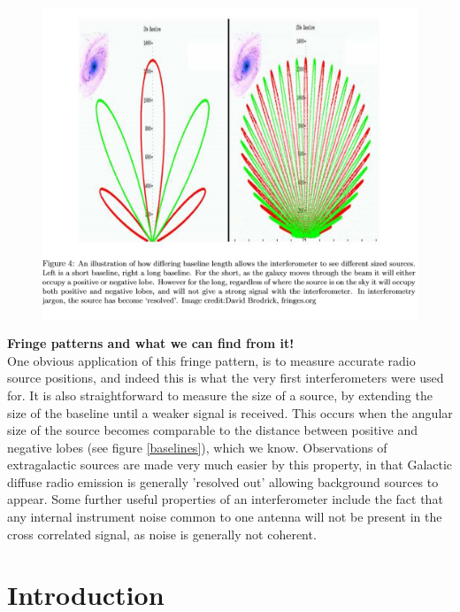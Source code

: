 \documentclass[10pt]{report}
\newcommand{\tbf}[1]{\textbf{#1}}
\begin{document}
\begin{figure}\label{baslines}
\includegraphics[scale=1]{loshortbaselines.png}
\end{figure}

\tbf{Fringe patterns and what we can find from it!}\\

One obvious application of this fringe pattern, is to measure accurate radio source positions, and indeed this is what the very first interferometers were used for. It is also straightforward to measure the size of a source, by extending the size of the baseline until a weaker signal is received. This occurs when the angular size of the source becomes comparable to the distance between positive and negative lobes (see figure \ref{baselines}), which we know. Observations of extragalactic sources are made very much easier by this property, in that Galactic diffuse radio emission is generally 'resolved out' allowing background sources to appear. Some further useful properties of an interferometer include the fact that any internal instrument noise common to one antenna will not be present in the cross correlated signal, as noise is generally not coherent.

\chapter{Introduction}
\end{document}
